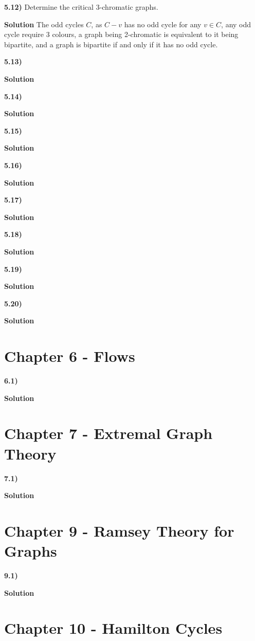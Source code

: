 \documentclass[11pt]{article}
\theoremstyle{plain}
\begin{document}
\textbf{5.12)} Determine the critical 3-chromatic graphs.

\noindent \textbf{Solution} The odd cycles $C$, as $C-v$ has no odd cycle for any $v \in C$, any odd cycle require 3 colours, a graph being 2-chromatic is equivalent to it being bipartite, and a graph is bipartite if and only if it has no odd cycle.

\textbf{5.13)} 

\noindent \textbf{Solution} 

\textbf{5.14)} 

\noindent \textbf{Solution} 

\textbf{5.15)} 

\noindent \textbf{Solution} 

\textbf{5.16)} 

\noindent \textbf{Solution} 

\textbf{5.17)} 

\noindent \textbf{Solution} 

\textbf{5.18)} 

\noindent \textbf{Solution} 

\textbf{5.19)} 

\noindent \textbf{Solution} 

\textbf{5.20)} 

\noindent \textbf{Solution} 

\section*{Chapter 6 - Flows}

\textbf{6.1)} 


\noindent \textbf{Solution} 

\section*{Chapter 7 - Extremal Graph Theory}

\textbf{7.1)} 


\noindent \textbf{Solution} 

\section*{Chapter 9 - Ramsey Theory for Graphs}

\textbf{9.1)} 


\noindent \textbf{Solution} 

\section*{Chapter 10 - Hamilton Cycles}
\end{document}
